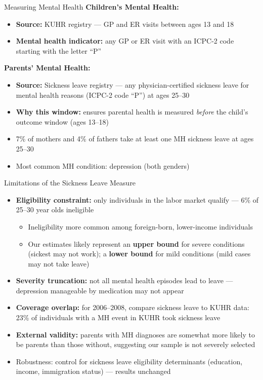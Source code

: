\documentclass[aspectratio=169]{beamer}
\begin{document}
\begin{frame}{Measuring Mental Health}
  \textbf{Children's Mental Health:}
  \begin{itemize}
    \item \textbf{Source:} KUHR registry --- GP and ER visits between ages 13 and 18
    \item \textbf{Mental health indicator:} any GP or ER visit with an ICPC-2 code starting with the letter ``P''
  \end{itemize}
  \textbf{Parents' Mental Health:}
  \begin{itemize}
    \item \textbf{Source:} Sickness leave registry --- any physician-certified sickness leave for mental health reasons (ICPC-2 code ``P'') at ages 25--30
    \item \textbf{Why this window:} ensures parental health is measured \textit{before} the child's outcome window (ages 13--18)
    \item 7\% of mothers and 4\% of fathers take at least one MH sickness leave at ages 25--30
    \item Most common MH condition: depression (both genders)
  \end{itemize}
\end{frame}

\begin{frame}{Limitations of the Sickness Leave Measure}
  \begin{itemize}
    \item \textbf{Eligibility constraint:} only individuals in the labor market qualify --- 6\% of 25--30 year olds ineligible
    \begin{itemize}
      \item Ineligibility more common among foreign-born, lower-income individuals
      \item Our estimates likely represent an \textbf{upper bound} for severe conditions (sickest may not work); a \textbf{lower bound} for mild conditions (mild cases may not take leave)
    \end{itemize}
    \item \textbf{Severity truncation:} not all mental health episodes lead to leave --- depression manageable by medication may not appear
    \item \textbf{Coverage overlap:} for 2006--2008, compare sickness leave to KUHR data: 23\% of individuals with a MH event in KUHR took sickness leave
    \item \textbf{External validity:} parents with MH diagnoses are somewhat more likely to be parents than those without, suggesting our sample is not severely selected
    \item Robustness: control for sickness leave eligibility determinants (education, income, immigration status) --- results unchanged
  \end{itemize}
\end{frame}
\end{document}
